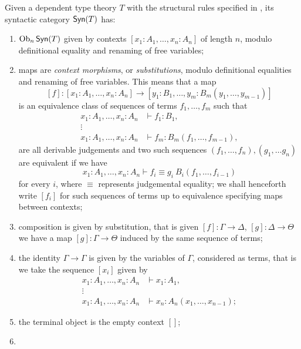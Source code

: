 \begin{construction}\cite[2.6]{Car78}
  Given a dependent type theory $T$ with the structural rules specified in
  \cite[A.1]{KL12}, its syntactic category $\operatorname{\mathsf{Syn}}(T)$ has:
  \begin{enumerate}
    \item $\operatorname{Ob}_n\operatorname{\mathsf{Syn}}(T)$ given by contexts $[x_1:A_1,\ldots,x_n:A_n]$ of length
      $n$, modulo definitional equality and renaming of free variables;
    \item maps are \emph{context morphisms}, or \emph{substitutions}, modulo
      definitional equalities and renaming of free variables. This means that a
      map
      \[[f]\colon[x_1:A_1,\ldots,x_n:A_n]\rightarrow[y_1:B_1,\ldots,y_m:B_m(y_1,\ldots,y_{m-1})]\]
      is an equivalence class of sequences of terms $f_1,\ldots,f_m$ such that
      \begin{align*}
        x_1:A_1,\ldots,x_n:A_n &\vdash f_1:B_1, \\
        \vdots & \\
        x_1:A_1,\ldots,x_n:A_n &\vdash f_m:B_m(f_1,\ldots,f_{m-1}),
      \end{align*}
      are all derivable judgements and two such sequences
      $(f_1,\ldots,f_n),(g_1,\ldots g_n)$ are equivalent if we have
      \[x_1:A_1,\ldots,x_n:A_n\vdash f_i\equiv g_i\:B_i(f_1,\ldots,f_{i-1})\]
      for every $i$, where $\equiv$ represents judgemental equality; we shall
      henceforth write $[f_i]$ for such sequences of terms up to equivalence
      specifying maps between contexts;
    \item composition is given by substitution, that is given
      $[f]\colon\Gamma\rightarrow\Delta$, $[g]\colon\Delta\rightarrow\Theta$ we
      have a map $[g]\colon\Gamma\rightarrow\Theta$ induced by the same sequence
      of terms;
    \item the identity $\Gamma\rightarrow\Gamma$ is given by the variables of
      $\Gamma$, considered as
      terms, that is we take the sequence $[x_i]$ given by
      \begin{align*}
        x_1:A_1,\ldots,x_n:A_n &\vdash x_1:A_1, \\
        \vdots & \\
        x_1:A_1,\ldots,x_n:A_n &\vdash x_n:A_n(x_1,\ldots,x_{n-1});
      \end{align*}
    \item the terminal object is the empty context $[]$;
    \item

\end{enumerate}
\end{construction}
